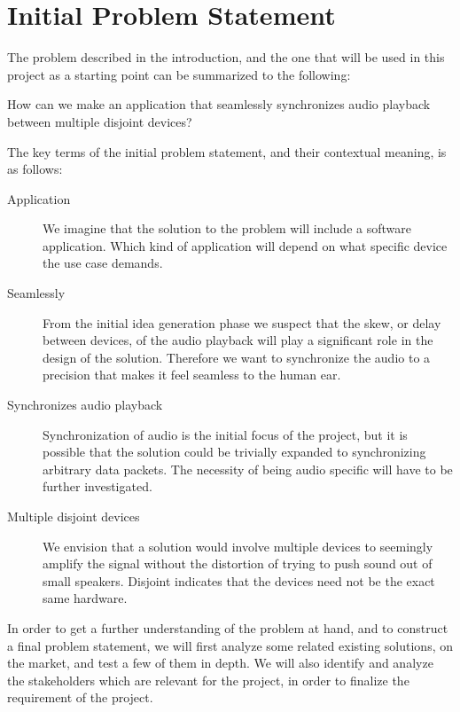 \section{Initial Problem Statement}\label{sec:initial_problem}

The problem described in the introduction, and the one that will be used
in this project as a starting point can be summarized to the following:

\begin{problemstatement}
	How can we make an application that seamlessly synchronizes audio
	playback between multiple disjoint devices?
\end{problemstatement}

The key terms of the initial problem statement, and their contextual meaning,
is as follows:
\begin{description}
	\item[Application] We
		imagine that the solution to the problem will include a software
		application. Which kind of application will depend on what specific
		device the use case demands.
	\item[Seamlessly] From the initial idea generation phase we suspect
		that the skew, or delay between devices, of the audio playback will
		play a significant role in the design of the solution. Therefore we
		want to synchronize the audio to a precision that makes it feel
		seamless to the human ear.
	\item[Synchronizes audio playback] Synchronization of audio is the initial
		focus of the project, but it is possible that the solution could be
		trivially expanded to synchronizing arbitrary data packets. The
		necessity of being audio specific will have to be further investigated.
	\item[Multiple disjoint devices] We envision that
		a solution would involve multiple devices to seemingly amplify the
		signal without the distortion of trying to push sound out of
		small speakers. Disjoint indicates that the devices need not be the 
		exact same hardware. 
\end{description}

In order to get a further understanding of the problem at hand, and to
construct a final problem statement, we will first analyze some related
existing solutions, on the market, and test a few of them in depth. We will
also identify and analyze the stakeholders which are relevant for the project,
in order to finalize the requirement of the project.
